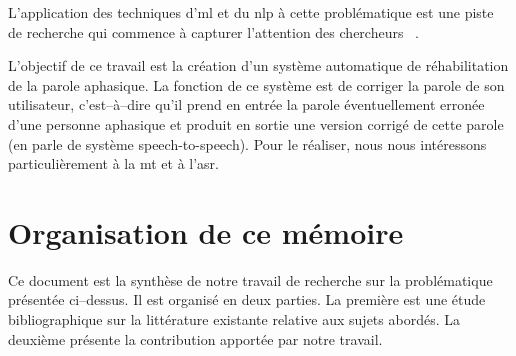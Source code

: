 L'application des techniques d'\gls{ml} et du \gls{nlp} à cette problématique est une piste de recherche 
qui commence à capturer l'attention des chercheurs%
~\cite{Smaili_Langlois_Pribil_2022,Qin_Lee_Kong_Lin_2022,Misra_Mishra_Gandhi_2022,%
Li_Knopman_Xu_Cohen_Pakhomov_2022,Misra_Mishra_Gandhi_2022}.

L'objectif de ce travail est la création d'un système automatique de réhabilitation de la parole aphasique.
La fonction de ce système est de corriger la parole de son utilisateur, 
c'est--à--dire qu'il prend en entrée la parole éventuellement erronée d'une personne aphasique
et produit en sortie une version corrigé de cette parole 
(en parle de système \foreignlanguage{english}{speech-to-speech}).
Pour le réaliser, nous nous intéressons particulièrement à la \gls{mt} et à l'\gls{asr}.

\section*{Organisation de ce mémoire}

Ce document est la synthèse de notre travail de recherche sur la problématique présentée ci--dessus.
Il est organisé en deux parties.
La première est une étude bibliographique sur la littérature existante relative aux sujets abordés.
La deuxième présente la contribution apportée par notre travail.

\subsection*{~}

